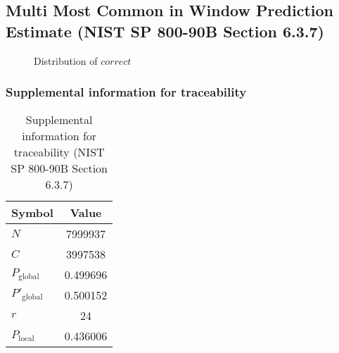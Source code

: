 \documentclass[a3paper,xelatex,english]{bxjsarticle}
\begin{document}
\subsection{Multi Most Common in Window Prediction Estimate (NIST SP 800-90B Section 6.3.7)}\label{sec:Binary637}

\begin{figure}[htbp]
\centering

\caption{Distribution of $correct$}
\end{figure}
\subsubsection{Supplemental information for traceability}
\renewcommand{\arraystretch}{1.8}
\begin{table}[h]
\caption{Supplemental information for traceability (NIST SP 800-90B Section 6.3.7)}
\begin{center}
\begin{tabular}{|l|c|}
\hline 
\rowcolor{anotherlightblue} %
Symbol				& Value \\ \hline 
$N$				& 7999937\\ \hline 
$C$				& 3997538\\ \hline 
$P_{\textrm{global}}$				& 0.499696\\ \hline 
$P'_{\textrm{global}}$			& 0.500152\\ \hline 
$r$				& 24\\ \hline 
$P_{\textrm{local}}$ 			& 0.436006\\ \hline
\end{tabular}
\end{center}
\end{table}
\renewcommand{\arraystretch}{1.4}
\clearpage
\end{document}

